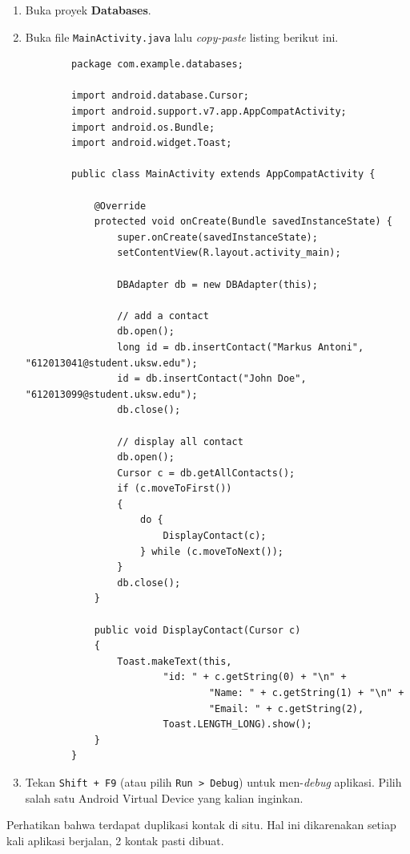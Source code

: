 \documentclass{scrartcl}
\begin{document}
	\begin{enumerate}
		\item Buka proyek \textbf{Databases}.
		\item Buka file \texttt{MainActivity.java} lalu \textit{copy-paste} listing berikut ini.
		\begin{verbatim}
		package com.example.databases;
		
		import android.database.Cursor;
		import android.support.v7.app.AppCompatActivity;
		import android.os.Bundle;
		import android.widget.Toast;
		
		public class MainActivity extends AppCompatActivity {
		
			@Override
			protected void onCreate(Bundle savedInstanceState) {
				super.onCreate(savedInstanceState);
				setContentView(R.layout.activity_main);
				
				DBAdapter db = new DBAdapter(this);
				
				// add a contact
				db.open();
				long id = db.insertContact("Markus Antoni", "612013041@student.uksw.edu");
				id = db.insertContact("John Doe", "612013099@student.uksw.edu");
				db.close();
				
				// display all contact
				db.open();
				Cursor c = db.getAllContacts();
				if (c.moveToFirst())
				{
					do {
						DisplayContact(c);
					} while (c.moveToNext());
				}
				db.close();
			}
			
			public void DisplayContact(Cursor c)
			{
				Toast.makeText(this,
						"id: " + c.getString(0) + "\n" +
								"Name: " + c.getString(1) + "\n" +
								"Email: " + c.getString(2),
						Toast.LENGTH_LONG).show();
			}
		}
		\end{verbatim}
		\item Tekan \texttt{Shift + F9} (atau pilih \texttt{Run > Debug}) untuk men-\textit{debug} aplikasi. Pilih salah satu Android Virtual Device yang kalian inginkan.
	\end{enumerate}
	Perhatikan bahwa terdapat duplikasi kontak di situ. Hal ini dikarenakan setiap kali aplikasi berjalan, 2 kontak pasti dibuat.
\end{document}
